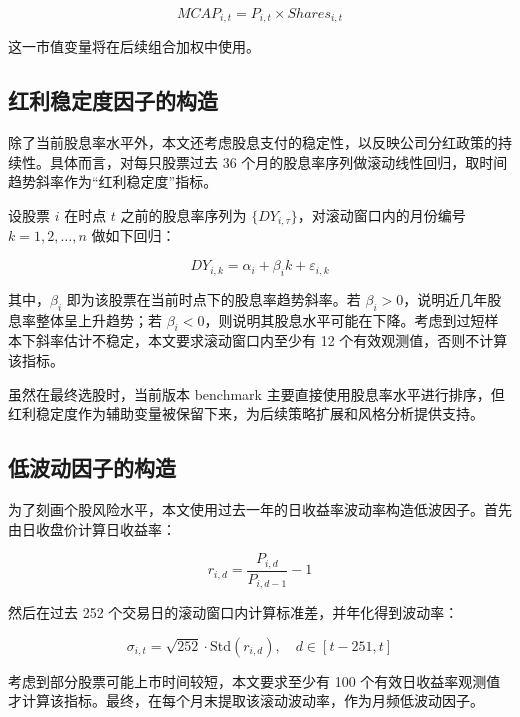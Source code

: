 \documentclass[a4paper,10pt]{article}
\begin{document}
\begin{equation}
MCAP_{i,t} = P_{i,t} \times Shares_{i,t}
\end{equation}

这一市值变量将在后续组合加权中使用。

\subsection{红利稳定度因子的构造}

除了当前股息率水平外，本文还考虑股息支付的稳定性，以反映公司分红政策的持续性。具体而言，对每只股票过去 36 个月的股息率序列做滚动线性回归，取时间趋势斜率作为“红利稳定度”指标。

设股票 $i$ 在时点 $t$ 之前的股息率序列为 $\{DY_{i,\tau}\}$，对滚动窗口内的月份编号 $k = 1,2,\dots,n$ 做如下回归：

\begin{equation}
DY_{i,k} = \alpha_i + \beta_i k + \varepsilon_{i,k}
\end{equation}

其中，$\beta_i$ 即为该股票在当前时点下的股息率趋势斜率。若 $\beta_i > 0$，说明近几年股息率整体呈上升趋势；若 $\beta_i < 0$，则说明其股息水平可能在下降。考虑到过短样本下斜率估计不稳定，本文要求滚动窗口内至少有 12 个有效观测值，否则不计算该指标。

虽然在最终选股时，当前版本 benchmark 主要直接使用股息率水平进行排序，但红利稳定度作为辅助变量被保留下来，为后续策略扩展和风格分析提供支持。

\subsection{低波动因子的构造}

为了刻画个股风险水平，本文使用过去一年的日收益率波动率构造低波因子。首先由日收盘价计算日收益率：

\begin{equation}
r_{i,d} = \frac{P_{i,d}}{P_{i,d-1}} - 1
\end{equation}

然后在过去 252 个交易日的滚动窗口内计算标准差，并年化得到波动率：

\begin{equation}
\sigma_{i,t} = \sqrt{252} \cdot \mathrm{Std}(r_{i,d}), \quad d \in [t-251, t]
\end{equation}

考虑到部分股票可能上市时间较短，本文要求至少有 100 个有效日收益率观测值才计算该指标。最终，在每个月末提取该滚动波动率，作为月频低波动因子。
\end{document}
